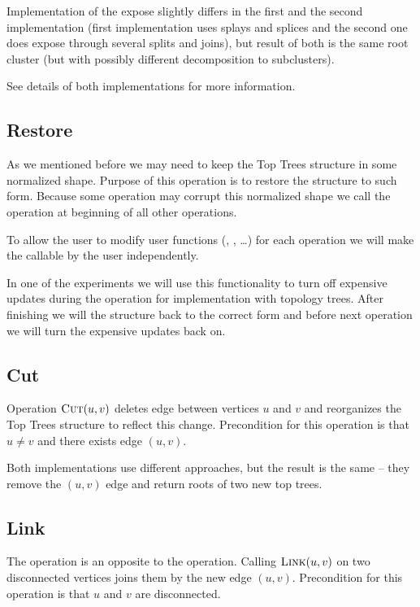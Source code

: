 Implementation of the expose slightly differs in the first and the second
implementation (first implementation uses splays and splices and the second one
does expose through several splits and joins), but result of both is the
same root cluster (but with possibly different decomposition to subclusters).

See details of both implementations for more information.

\subsection{\sc Restore}

As we mentioned before we may need to keep the Top Trees structure in some
normalized shape. Purpose of this operation is to restore the structure
to such form. Because some operation may corrupt this normalized shape we
call the \Restore{} operation at beginning of all other operations.

To allow the user to modify user functions (\Split, \Join, \dots) for each
operation we will make the \Restore{} callable by the user independently.

In one of the experiments we will use this functionality to turn off expensive
updates during the \Expose{} operation for implementation with topology trees.
After finishing \Expose{} we will \Restore{} the structure back to the correct
form and before next operation we will turn the expensive updates back on.

\subsection{\sc Cut}

Operation $\hbox{\sc Cut}(u,v)$ deletes edge between vertices $u$ and $v$ and reorganizes
the Top Trees structure to reflect this change. Precondition for this operation
is that $u\ne v$ and there exists edge $(u,v)$.

Both implementations use different approaches, but the result is the same --
they remove the $(u,v)$ edge and return roots of two new top trees.

\subsection{\sc Link}

The \Link{} operation is an opposite to the \Cut{} operation. Calling $\hbox{\sc Link}(u,v)$ on
two disconnected vertices joins them by the new edge $(u,v)$. Precondition for
this operation is that $u$ and $v$ are disconnected.

